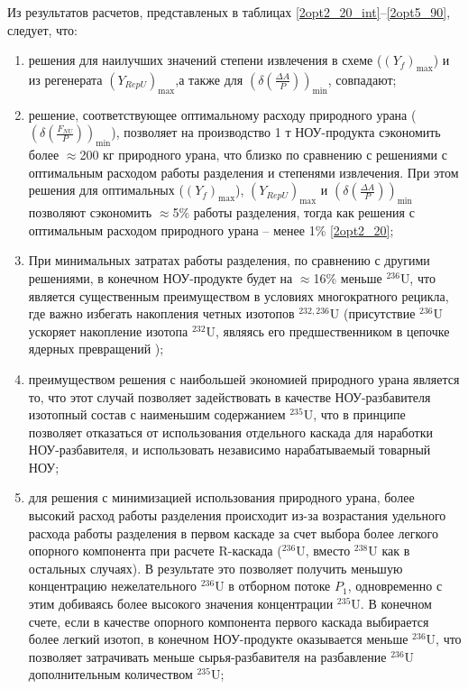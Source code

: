 Из результатов расчетов, представленых в таблицах \ref{2opt2_20_int}--\ref{2opt5_90}, следует, что:
\begin{enumerate}
    \item решения для наилучших значений степени извлечения в схеме ($(Y_{f})_\text{max}$) и из регенерата $(Y_{RepU})_\text{max}$,а также для $(\delta(\frac{\Delta A}{P}))_\text{min}$, совпадают;
    \item решение, соответствующее оптимальному расходу природного урана ($(\delta(\frac{F_{NU}}{P}))_\text{min}$), позволяет на производство 1 т НОУ-продукта сэкономить более $\approx$200 кг природного урана, что близко по сравнению с решениями с оптимальным расходом работы разделения и степенями извлечения. При этом решения для оптимальных ($(Y_{f})_\text{max}$), $(Y_{RepU})_\text{max}$ и $(\delta(\frac{\Delta A}{P}))_\text{min}$ позволяют сэкономить $\approx$5\% работы разделения, тогда как решения с оптимальным расходом природного урана -- менее 1\% \ref{2opt2_20};
    \item При минимальных затратах работы разделения, по сравнению с другими решениями, в конечном НОУ-продукте будет на $\approx$16\% меньше $^{236}$U, что является существенным преимуществом в условиях многократного рецикла, где важно избегать накопления четных изотопов $^{232,236}$U (присутствие $^{236}$U ускоряет накопление изотопа $^{232}$U, являясь его предшественником в цепочке ядерных превращений \cite{smirnovEvolutionIsotopicComposition2012});
    \item преимуществом решения с наибольшей экономией природного урана является то, что этот случай позволяет задействовать в качестве НОУ-разбавителя изотопный состав с наименьшим содержанием $^{235}$U, что в принципе позволяет отказаться от использования отдельного каскада для наработки НОУ-разбавителя, и использовать независимо нарабатываемый товарный НОУ;
    \item для решения с минимизацией использования природного урана, более высокий расход работы разделения происходит из-за возрастания удельного расхода работы разделения в первом каскаде за счет выбора более легкого опорного компонента при расчете R-каскада ($^{236}$U, вместо $^{238}$U как в остальных случаях). В результате это позволяет получить меньшую концентрацию нежелательного $^{236}$U в отборном потоке $P_{1}$, одновременно с этим добиваясь более высокого значения концентрации $^{235}$U. В конечном счете, если в качестве опорного компонента первого каскада выбирается более легкий изотоп, в конечном НОУ-продукте оказывается меньше $^{236}$U, что позволяет затрачивать меньше сырья-разбавителя на разбавление $^{236}$U дополнительным количеством $^{235}$U;

\end{enumerate}
